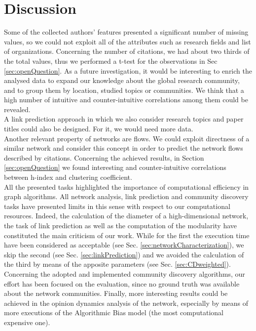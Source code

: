 \documentclass[sigchi]{acmart}
\begin{document}
\section{Discussion}\label{sec:discussion}
Some of the collected authors' features presented a significant number of missing values, so we could not exploit all of the attributes such as research fields and list of organizations. 
Concerning the number of citations, we had about two thirds of the total values, thus we performed a t-test for the observations in Sec \ref{sec:openQuestion}. As a future investigation, it would be interesting to enrich the analysed data to expand our knowledge about the global research community, and to group them by location, studied topics or communities. We think that a high number of intuitive and counter-intuitive correlations among them could be revealed. \\
A link prediction approach in which we also consider research topics and paper titles could also be designed. For it, we would need more data. \\ 
Another relevant property of networks are flows. We could exploit directness of a similar network and consider this concept in order to predict the network flows described by citations.
Concerning the achieved results, in Section \ref{sec:openQuestion} we found interesting and counter-intuitive correlations between h-index and clustering coefficient. \\
All the presented tasks highlighted the importance of computational efficiency in graph algorithms. All network analysis, link prediction and community discovery tasks have presented limits in this sense with respect to our computational resources. Indeed, the calculation of the diameter of a high-dimensional network, the task of link prediction as well as the computation of the modularity have constituted the main criticism of our work. While for the first the execution time have been considered as acceptable (see Sec. \ref{sec:networkCharacterization}), we skip the second (see Sec. \ref{sec:linkPrediction}) and we avoided the calculation of the third by means of the apposite parameters (see Sec. \ref{sec:CDweighted}).
Concerning the adopted and implemented community discovery algorithms, our effort has been focused on the evaluation, since no ground truth was available about the network communities. Finally, more interesting results could be achieved in the opinion dynamics analysis of the network, especially by means of more executions of the Algorithmic Bias model (the most computational expensive one).
\end{document}
